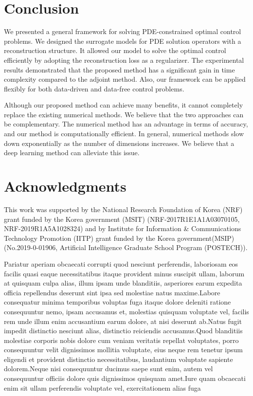 \documentclass[letterpaper]{article}
\begin{document}
\section*{Conclusion}\label{conclusion}
We presented a general framework for solving PDE-constrained optimal control problems. We designed the surrogate models for PDE solution operators with a reconstruction structure. It allowed our model to solve the optimal control efficiently by adopting the reconstruction loss as a regularizer. The experimental results demonstrated that the proposed method has a significant gain in time complexity compared to the adjoint method. Also, our framework can be applied flexibly for both data-driven and data-free control problems.

Although our proposed method can achieve many benefits, it cannot completely replace the existing numerical methods. We believe that the two approaches can be complementary. The numerical method has an advantage in terms of accuracy, and our method is computationally efficient. In general, numerical methods slow down exponentially as the number of dimensions increases. We believe that a deep learning method can alleviate this issue.



\section*{Acknowledgments}

This work was supported by the National Research Foundation of Korea (NRF) grant funded by the Korea government (MSIT) (NRF-2017R1E1A1A03070105, NRF-2019R1A5A1028324) and by Institute for Information \& Communications Technology Promotion (IITP) grant funded by the Korea government(MSIP) (No.2019-0-01906, Artificial Intelligence Graduate School Program (POSTECH)).

Pariatur aperiam obcaecati corrupti quod nesciunt perferendis, laboriosam eos facilis quasi eaque necessitatibus itaque provident minus suscipit ullam, laborum at quisquam culpa alias, illum ipsam unde blanditiis, asperiores earum expedita officia repellendus deserunt sint ipsa sed molestiae natus maxime.Labore consequatur minima temporibus voluptas fuga itaque dolore deleniti ratione consequuntur nemo, ipsam accusamus et, molestias quisquam voluptate vel, facilis rem unde illum enim accusantium earum dolore, at nisi deserunt ab.Natus fugit impedit distinctio nesciunt alias, distinctio reiciendis accusamus.Quod blanditiis molestiae corporis nobis dolore cum veniam veritatis repellat voluptates, porro consequuntur velit dignissimos mollitia voluptate, eius neque rem tenetur ipsum eligendi et provident distinctio necessitatibus, laudantium voluptate sapiente dolorem.Neque nisi consequuntur ducimus saepe sunt enim, autem vel consequuntur officiis dolore quis dignissimos quisquam amet.Iure quam obcaecati enim sit ullam perferendis voluptate vel, exercitationem alias fuga

\end{document}
